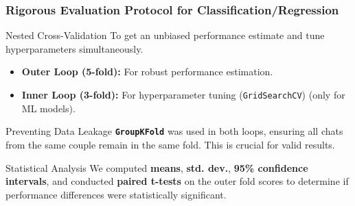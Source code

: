 \documentclass[aspectratio=169]{beamer}
\begin{document}
\begin{frame}
  \frametitle{Rigorous Evaluation Protocol for Classification/Regression}
  
  \begin{alertblock}{Nested Cross-Validation}
    To get an unbiased performance estimate and tune hyperparameters simultaneously.
    \begin{itemize}
      \item \textbf{Outer Loop (5-fold):} For robust performance estimation.
      \item \textbf{Inner Loop (3-fold):} For hyperparameter tuning (\texttt{GridSearchCV}) (only for ML models).
    \end{itemize}
  \end{alertblock}
  
  \begin{block}{Preventing Data Leakage}
    \textbf{\texttt{GroupKFold}} was used in both loops, ensuring all chats from the same couple remain in the same fold. This is crucial for valid results.
  \end{block}
  
  \begin{block}{Statistical Analysis}
    We computed \textbf{means}, \textbf{std. dev.}, \textbf{95\% confidence intervals}, and conducted \textbf{paired t-tests} on the outer fold scores to determine if performance differences were statistically significant.
  \end{block}
\end{frame}
\end{document}
